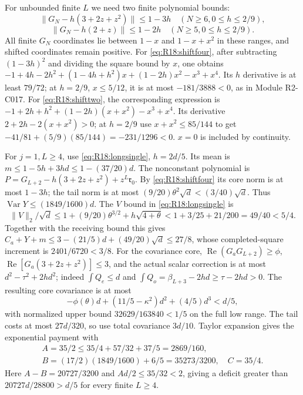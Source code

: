 For unbounded finite $L$ we need two finite polynomial bounds:
\begin{equation}\tag{R18.6.1}\label{eq:R18:shiftfour}
\|G_N-h(3+2z+z^2)\|\le1-3h\quad(N\ge6,0\le h\le2/9),
\end{equation}
\begin{equation}\tag{R18.6.2}\label{eq:R18:shifttwo}
\|G_N-h(2+z)\|\le1-2h\quad(N\ge5,0\le h\le2/9).
\end{equation}
All finite $G_N$ coordinates lie between $1-x$ and $1-x+x^2$ in
these ranges, and shifted coordinates remain positive.
For \eqref{eq:R18:shiftfour}, after subtracting $(1-3h)^2$ and
dividing the square bound by $x$, one obtains
$-1+4h-2h^2+(1-4h+h^2)x+(1-2h)x^2-x^3+x^4$.
Its $h$ derivative is at least $79/72$; at $h=2/9$, $x\le5/12$,
it is at most $-181/3888<0$, as in Module R2-C017.
For \eqref{eq:R18:shifttwo}, the corresponding expression is
$-1+2h+h^2+(1-2h)(x+x^2)-x^3+x^4$.
Its derivative $2+2h-2(x+x^2)>0$; at $h=2/9$ use
$x+x^2\le85/144$ to get
$-41/81+(5/9)(85/144)=-231/1296<0$.
$x=0$ is included by continuity.

For $j=1,L\ge4$, use \eqref{eq:R18:longsingle}, $h=2d/5$.
Its mean is $m\le1-5h+3hd\le1-(37/20)d$.
The nonconstant polynomial is
$P=G_{L+2}-h(3+2z+z^2)+z^L\mathfrak r_0$.
By \eqref{eq:R18:shiftfour} its core norm is at most $1-3h$;
the tail norm is at most $(9/20)\theta^2\sqrt d<(3/40)\sqrt d$.
Thus $\operatorname{Var}Y\le(1849/1600)d$.
The $V$ bound in \eqref{eq:R18:longsingle} is
\[
\|V\|_2/\sqrt d\le1+(9/20)\theta^{3/2}+h\sqrt{4+\theta}
<1+3/25+21/200=49/40<5/4.
\]
Together with the receiving bound this gives
$C_a+Y+m\le3-(21/5)d+(49/20)\sqrt d\le27/8$,
whose completed-square increment is $2401/6720<3/8$.
For the covariance core,
$\operatorname{Re}(G_aG_{L+2})\ge\phi$,
$\operatorname{Re}[G_a(3+2z+z^2)]\le3$, and the actual scalar
correction is at most $d^2-\tau^2+2hd^2$;
indeed $\int Q_e\le d$ and
$\int Q_o=\beta_{L+3}-2hd\ge\tau-2hd>0$.
The resulting core covariance is at most
\[
-\phi(\theta)d+(11/5-\kappa^2)d^2+(4/5)d^3<d/5,
\]
with normalized upper bound $32629/163840<1/5$ on the full low range.
The tail costs at most $27d/320$, so use total covariance $3d/10$.
Taylor expansion gives the exponential payment with
\[
\begin{gathered}
A=35/2\le35/4+57/32+37/5=2869/160,\\
B=(17/2)(1849/1600)+6/5=35273/3200,\quad C=35/4.
\end{gathered}
\]
Here $A-B=20727/3200$ and $Ad/2\le35/32<2$, giving a deficit
greater than $20727d/28800>d/5$ for every finite $L\ge4$.

